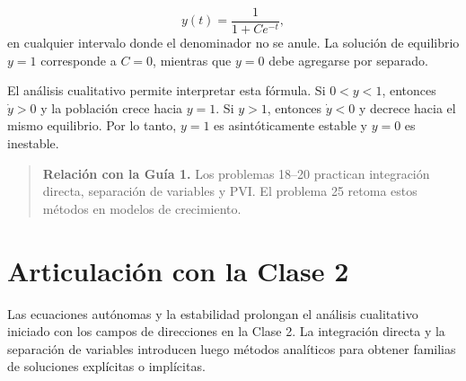 \documentclass[12pt,a4paper]{article}
\begin{document}
	\[
	y(t)=\frac{1}{1+Ce^{-t}},
	\]
en cualquier intervalo donde el denominador no se anule. La solución de equilibrio \(y=1\) corresponde a \(C=0\), mientras que \(y=0\) debe agregarse por separado.

	El análisis cualitativo permite interpretar esta fórmula. Si \(0<y<1\), entonces \(\dot{y}>0\) y la población crece hacia \(y=1\). Si \(y>1\), entonces \(\dot{y}<0\) y decrece hacia el mismo equilibrio. Por lo tanto, \(y=1\) es asintóticamente estable y \(y=0\) es inestable.

	\begin{quote}
		\textbf{Relación con la Guía 1.} Los problemas 18--20 practican integración directa, separación de variables y PVI. El problema 25 retoma estos métodos en modelos de crecimiento.
	\end{quote}

	\clearpage
	\section*{Articulación con la Clase 2}

	Las ecuaciones autónomas y la estabilidad prolongan el análisis cualitativo iniciado con los campos de direcciones en la Clase 2. La integración directa y la separación de variables introducen luego métodos analíticos para obtener familias de soluciones explícitas o implícitas.
\end{document}
